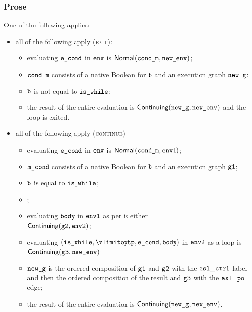 \subsubsection{Prose}
One of the following applies:
\begin{itemize}
\item all of the following apply (\textsc{exit}):
  \begin{itemize}
    \item evaluating $\texttt{e\_cond}$ in $\texttt{env}$ is $\textsf{Normal}(\texttt{cond\_m}, \texttt{new\_env})$\ProseOrAbnormal;
    \item $\texttt{cond\_m}$ consists of a native Boolean for $\texttt{b}$ and an execution graph $\texttt{new\_g}$;
    \item $\texttt{b}$ is not equal to $\texttt{is\_while}$;
    \item the result of the entire evaluation is $\textsf{Continuing}(\texttt{new\_g}, \texttt{new\_env})$
    and the loop is exited.
  \end{itemize}
\item all of the following apply (\textsc{continue}):
  \begin{itemize}
    \item evaluating $\texttt{e\_cond}$ in $\texttt{env}$ is $\textsf{Normal}(\texttt{cond\_m}, \texttt{env1})$;
    \item $\texttt{m\_cond}$ consists of a native Boolean for $\texttt{b}$ and an execution graph $\texttt{g1}$;
    \item $\texttt{b}$ is equal to $\texttt{is\_while}$;
    \item \Proseticklooplimit{$\vlimitopt$}{$\vlimitoptp$}\ProseOrError;
    \item evaluating $\texttt{body}$ in $\texttt{env1}$ as per  is either \\
    $\textsf{Continuing}(\texttt{g2}, \texttt{env2})$\ProseTerminateAs{\ReturningConfig, \ThrowingConfig, \DynErrorConfig};
    \item evaluating $(\iswhile, \vlimitoptp, \econd, \vbody)$ in $\texttt{env2}$ as a loop is \\
    $\textsf{Continuing}(\texttt{g3}, \texttt{new\_env})$\ProseTerminateAs{\ReturningConfig, \ThrowingConfig, \DynErrorConfig};
    \item $\texttt{new\_g}$ is the ordered composition of $\texttt{g1}$ and $\texttt{g2}$ with the $\mathtt{asl\_ctrl}$ label
    and then the ordered composition of the result and $\texttt{g3}$ with the $\mathtt{asl\_po}$ edge;
    \item the result of the entire evaluation is $\textsf{Continuing}(\texttt{new\_g}, \texttt{new\_env})$.
  \end{itemize}
\end{itemize}

